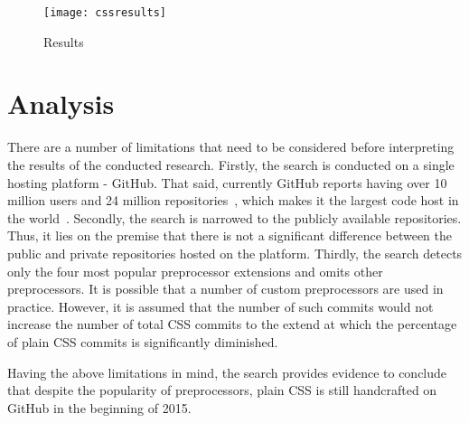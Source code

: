 \begin{figure}[h!]
  \centering
  \caption{Results}
  \label{cssresults}
  \texttt{[image: cssresults]}
\end{figure}

\section{Analysis}

There are a number of limitations that need to be considered before interpreting the results of the
conducted research. Firstly, the search is conducted on a single hosting platform - GitHub. That
said, currently GitHub reports having over 10 million users and 24 million
repositories~\cite{GitHub}, which makes it the largest code host in the
world~\cite{gousios2014lean}. Secondly, the search is narrowed to the publicly available
repositories. Thus, it lies on the premise that there is not a significant difference between the
public and private repositories hosted on the platform. Thirdly, the search detects only the four
most popular preprocessor extensions and omits other preprocessors. It is possible that a number of
custom preprocessors are used in practice. However, it is assumed that the number of such commits
would not increase the number of total CSS commits to the extend at which the percentage of plain
CSS commits is significantly diminished.

Having the above limitations in mind, the search provides evidence to conclude that despite the
popularity of preprocessors, plain CSS is still handcrafted on GitHub in the beginning of 2015.

